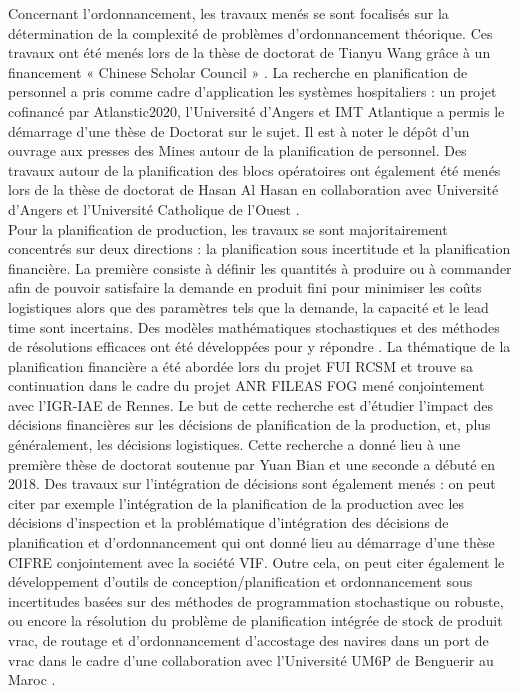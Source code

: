 Concernant l’ordonnancement, les travaux menés se sont focalisés sur la détermination de la complexité de problèmes d’ordonnancement théorique. Ces travaux ont été menés lors de la thèse de doctorat de Tianyu Wang grâce à un financement « Chinese Scholar Council » \cite{wang:hal-02062182,wang:hal-02062178}.  La recherche en planification de personnel a pris comme cadre d’application les systèmes hospitaliers : un projet cofinancé par Atlanstic2020, l’Université d’Angers et IMT Atlantique a permis le démarrage d’une thèse de Doctorat sur le sujet. Il est à noter le dépôt d’un ouvrage aux presses des Mines autour de la planification de personnel. Des travaux autour de la planification des blocs opératoires ont également été menés lors de la thèse de doctorat de Hasan Al Hasan en collaboration avec Université d’Angers et l’Université Catholique de l’Ouest \cite{alhasan:hal-01875359}. \\

Pour la planification de production, les travaux se sont majoritairement concentrés sur deux directions : la planification sous incertitude et la planification financière. La première consiste à définir les quantités à produire ou à commander afin de pouvoir satisfaire la demande en produit fini pour minimiser les coûts logistiques alors que des paramètres tels que la demande, la capacité et le lead time sont incertains. Des modèles mathématiques stochastiques et des méthodes de résolutions efficaces ont été développées pour y répondre \cite{borodin:hal-01313213,benammar:hal-01961194,benammar:hal-01769391,benammar:hal-02435962,benammar:hal-02415341,thevenin:hal-02485676}. La thématique de la planification financière a été abordée lors du projet FUI RCSM et trouve sa continuation dans le cadre du projet ANR FILEAS FOG mené conjointement avec l’IGR-IAE de Rennes. Le but de cette recherche est d'étudier l’impact des décisions financières sur les décisions de planification de la production, et, plus généralement, les décisions logistiques.  Cette recherche a donné lieu à une première thèse de doctorat soutenue par Yuan Bian \cite{bian:halshs-01683781,bian:hal-02190123} et une seconde a débuté en 2018.  Des travaux sur l’intégration de décisions sont également menés : on peut citer par exemple l’intégration de la planification de la production avec les décisions d’inspection \cite{bettayeb:hal-01689377} et la problématique d’intégration des décisions de planification et d’ordonnancement qui ont donné lieu au démarrage d’une thèse CIFRE conjointement avec la société VIF. Outre cela, on peut citer également le développement d’outils de conception/planification et ordonnancement sous incertitudes basées sur des méthodes de programmation stochastique ou robuste, ou encore la résolution du problème de planification intégrée de stock de produit vrac, de routage et d’ordonnancement d’accostage des navires dans un port de vrac dans le cadre d'une collaboration avec l’Université UM6P de Benguerir au Maroc \cite{Najid2020}. \\

